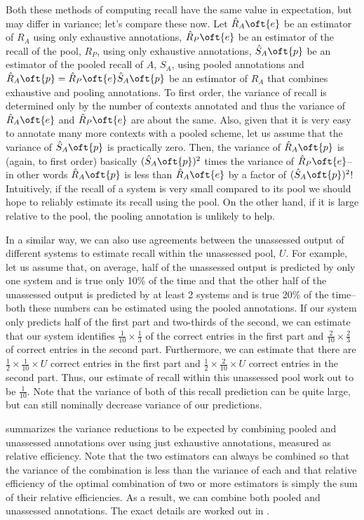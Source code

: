 Both these methods of computing recall have the same value in expectation, but may differ in variance; let's compare these now.
Let $\hat{R}_A\oft{e}$ be an estimator of $R_A$ using only exhaustive annotations, 
  $\hat{R}_P\oft{e}$ be an estimator of the recall of the pool, $R_P$, using only exhaustive annotations, 
  $\hat{S}_A\oft{p}$ be an estimator of the pooled recall of $A$, $S_A$, using pooled annotations and 
  $\hat{R}_A\oft{p} = \hat{R}_P\oft{e} \hat{S}_A\oft{p}$ be an estimator of $R_A$ that combines exhaustive and pooling annotations.
  To first order, the variance of recall is determined only by the number of contexts annotated and thus the variance of $\hat{R}_A\oft{e}$ and $\hat{R}_P\oft{e}$ are about the same.
  Also, given that it is very easy to annotate many more contexts with a pooled scheme, let us assume that the variance of $\hat{S}_A\oft{p}$ is practically zero.
  Then, the variance of $\hat{R}_A\oft{p}$ is (again, to first order) basically $(\hat{S}_A\oft{p})^2$ times the variance of $\hat{R}_P\oft{e}$-- in other words $\hat{R}_A\oft{p}$ is less than $\hat{R}_A\oft{e}$ by a factor of $(\hat{S}_A\oft{p})^2$!
Intuitively, if the recall of a system is very small compared to its pool we should hope to reliably estimate its recall using the pool.
On the other hand, if it is large relative to the pool, the pooling annotation is unlikely to help.

In a similar way, we can also use agreements between the unassessed output of different systems to estimate recall within the unassessed pool, $U$.
For example, let us assume that, on average, half of the unassessed output is predicted by only one system and is true only 10\% of the time and that the other half of the unassessed output is predicted by at least 2 systems and is true 20\% of the time-- both these numbers can be estimated using the pooled annotations.
If our system only predicts half of the first part and two-thirds of the second, we can estimate that our system identifies $\frac{1}{10} \times \frac{1}{3}$ of the correct entries in the first part and $\frac{2}{10} \times \frac{2}{3}$ of correct entries in the second part. Furthermore, we can estimate that there are $\frac{1}{2} \times \frac{1}{10} \times U$ correct entries in the first part and $\frac{1}{2} \times \frac{2}{10} \times U$ correct entries in the second part.
Thus, our estimate of recall within this unassessed pool work out to be $\frac{1}{10}$.
Note that the variance of both of this recall prediction can be quite large, but can still nominally decrease variance of our predictions.

 summarizes the variance reductions to be expected by combining pooled and unassessed annotations over using just exhaustive annotations, measured as relative efficiency.
Note that the two estimators can always be combined so that the variance of the combination is less than the variance of each and that relative efficiency of the optimal combination of two or more estimators is simply the sum of their relative efficiencies.
As a result, we can combine both pooled and unassessed annotations.
The exact details are worked out in .
